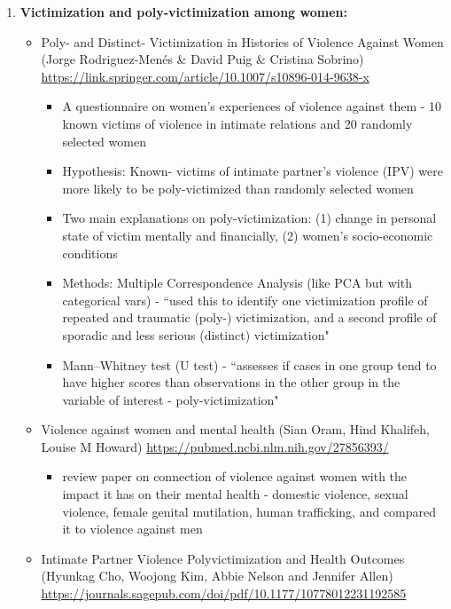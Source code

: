 \documentclass[letterpaper, 10pt]{article}
\begin{document}
\begin{enumerate}
    \item \textbf{Victimization and poly-victimization among women:}
    \begin{itemize}
        \item Poly- and Distinct- Victimization in Histories of Violence Against Women (Jorge Rodriguez-Menés \& David Puig \& Cristina Sobrino) \\  \url{https://link.springer.com/article/10.1007/s10896-014-9638-x}
        \begin{itemize}
            \item A questionnaire on women’s experiences of violence against them - 10 known victims of violence in intimate relations and 20 randomly selected women
            \item Hypothesis: Known- victims of intimate partner’s violence (IPV) were more likely to be poly-victimized than randomly selected women
            \item Two main explanations on poly-victimization: (1) change in personal state of victim mentally and financially, (2) women's socio-economic conditions
            \item Methods: Multiple Correspondence Analysis (like PCA but with categorical vars) - ``used this to identify one victimization profile of repeated and traumatic (poly-) victimization, and a second profile of sporadic and less serious (distinct) victimization"
            \item Mann–Whitney test (U test) - ``assesses if cases in one group tend to have higher scores than observations in the other group in the variable of interest - poly-victimization"
        \end{itemize}
        \item Violence against women and mental health (Sian Oram, Hind Khalifeh, Louise M Howard) \url{https://pubmed.ncbi.nlm.nih.gov/27856393/}
        \begin{itemize}
            \item review paper on connection of violence against women with the impact it has on their mental health - domestic violence, sexual violence, female genital mutilation, human trafficking, and compared it to violence against men
        \end{itemize}
        \item Intimate Partner Violence Polyvictimization and Health Outcomes (Hyunkag Cho, Woojong Kim, Abbie Nelson and Jennifer Allen) \url{https://journals.sagepub.com/doi/pdf/10.1177/10778012231192585}

\end{itemize}
\end{enumerate}
\end{document}
